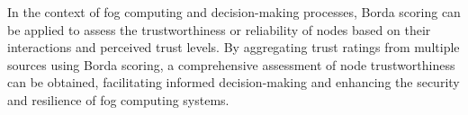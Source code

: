\documentclass{sn-jnl}%
\begin{document}
In the context of fog computing and decision-making processes, Borda scoring can be applied to assess the trustworthiness or reliability of nodes based on their interactions and perceived trust levels. By aggregating trust ratings from multiple sources using Borda scoring, a comprehensive assessment of node trustworthiness can be obtained, facilitating informed decision-making and enhancing the security and resilience of fog computing systems.
\end{document}

